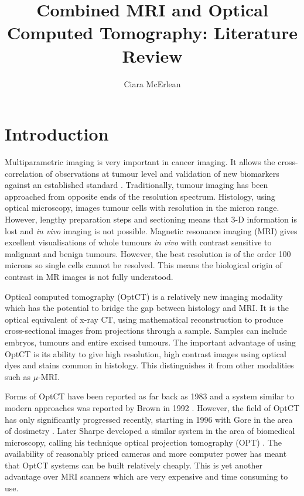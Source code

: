 \documentclass[12pt]{article}
\begin{document}
 
\title{Combined MRI and Optical Computed Tomography: Literature Review} 
\author{Ciara McErlean}

\section{Introduction}
\label{sec:intro}

Multiparametric imaging is very important in cancer imaging. It allows the cross-correlation of observations at tumour level and  validation of new biomarkers against an established standard \cite{Padhani:2010hfa}. 
Traditionally, tumour imaging has been approached from opposite ends of the resolution spectrum. Histology, using optical microscopy,  images tumour cells with resolution in the micron range. However, lengthy preparation steps and sectioning means that 3-D information is lost and \textit{in vivo} imaging is not possible. Magnetic resonance imaging (MRI) gives excellent visualisations of whole tumours \textit{in vivo} with contrast sensitive to malignant and benign tumours. However, the best resolution is of the order 100 microns so single cells cannot be resolved. This means the biological origin of contrast in MR images is not fully understood. 

Optical computed tomography (OptCT) is a relatively new imaging modality which has the potential to bridge the gap between histology and MRI. It is the optical equivalent of x-ray CT, using mathematical reconstruction to produce cross-sectional images from projections through a sample. Samples can include embryos, tumours and entire excised tumours. The important advantage of using OptCT is its ability to give high resolution, high contrast images using optical dyes and stains common in histology. This distinguishes it from other modalities such as $\mu$-MRI.

Forms of OptCT have been reported as far back as 1983 \cite{ray1983laser,kawata1990laser} %
and a system similar to modern approaches was reported by Brown in 1992 \cite{Brown:1992}. 
However, the field of OptCT has only significantly  progressed recently, starting in 1996 with Gore in the area of dosimetry  \cite{Gore:1999tg}. Later Sharpe developed a similar system in the area of biomedical microscopy, calling his technique optical projection tomography (OPT)  \cite{Sharpe:2002jp}. The availability of reasonably priced cameras and more computer power has meant that OptCT systems can be built relatively cheaply. This is yet another advantage over MRI scanners which are very expensive and time consuming to use.
\end{document}
